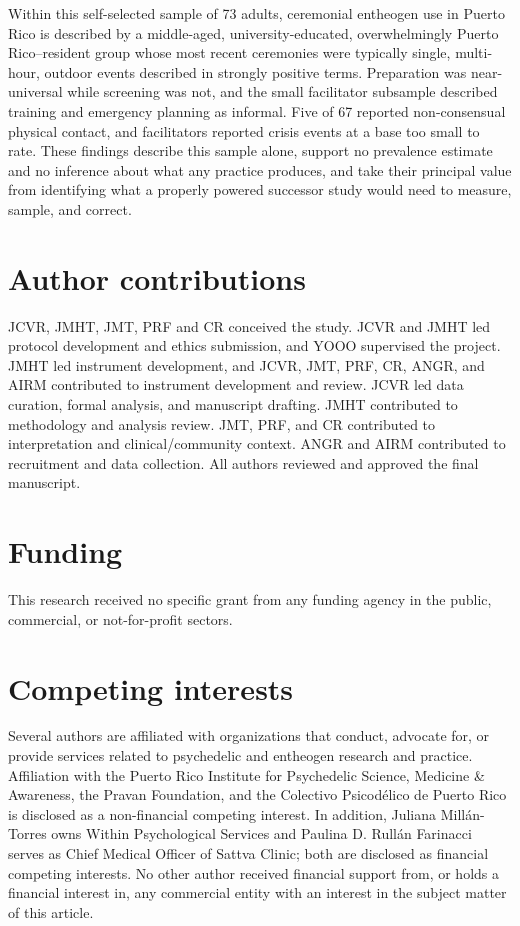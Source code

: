 \documentclass[12pt]{article}
\begin{document}
Within this self-selected sample of 73 adults, ceremonial entheogen use in Puerto Rico is described by a
middle-aged, university-educated, overwhelmingly Puerto Rico--resident group whose most recent ceremonies
were typically single, multi-hour, outdoor events described in strongly positive terms. Preparation was
near-universal while screening was not, and the small facilitator subsample described training and
emergency planning as informal. Five of 67 reported non-consensual physical contact, and facilitators
reported crisis events at a base too small to rate. These findings describe this sample alone, support no
prevalence estimate and no inference about what any practice produces, and take their principal value from
identifying what a properly powered successor study would need to measure, sample, and correct.

\section*{Author contributions}
JCVR, JMHT, JMT, PRF and CR conceived the study. JCVR and JMHT led protocol development and ethics
submission, and YOOO supervised the project. JMHT led instrument development, and JCVR, JMT, PRF, CR, ANGR,
and AIRM contributed to instrument development and review. JCVR led data curation, formal analysis, and
manuscript drafting. JMHT contributed to methodology and analysis review. JMT, PRF, and CR contributed to
interpretation and clinical/community context. ANGR and AIRM contributed to recruitment and data
collection. All authors reviewed and approved the final manuscript.

\section*{Funding}
This research received no specific grant from any funding agency in the public, commercial, or
not-for-profit sectors.

\section*{Competing interests}
Several authors are affiliated with organizations that conduct, advocate for, or provide services related
to psychedelic and entheogen research and practice. Affiliation with the Puerto Rico Institute for
Psychedelic Science, Medicine \& Awareness, the Pravan Foundation, and the Colectivo Psicod\'elico de
Puerto Rico is disclosed as a non-financial competing interest. In addition, Juliana Mill\'an-Torres owns
Within Psychological Services and Paulina D. Rull\'an Farinacci serves as Chief Medical Officer of Sattva
Clinic; both are disclosed as financial competing interests. No other author received financial support
from, or holds a financial interest in, any commercial entity with an interest in the subject matter of
this article.
\end{document}
